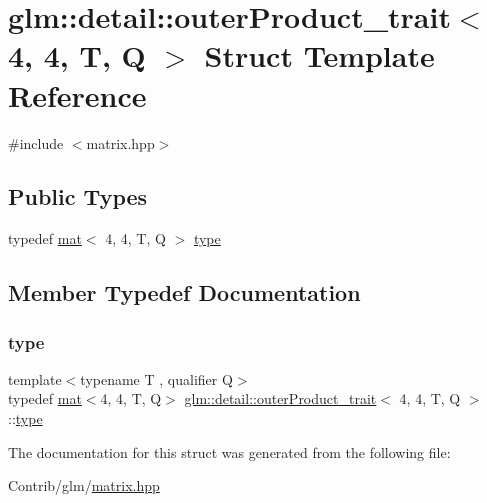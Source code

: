 \hypertarget{structglm_1_1detail_1_1outer_product__trait_3_014_00_014_00_01_t_00_01_q_01_4}{}\section{glm\+:\+:detail\+:\+:outer\+Product\+\_\+trait$<$ 4, 4, T, Q $>$ Struct Template Reference}
\label{structglm_1_1detail_1_1outer_product__trait_3_014_00_014_00_01_t_00_01_q_01_4}


{\ttfamily \#include $<$matrix.\+hpp$>$}

\subsection*{Public Types}
\begin{DoxyCompactItemize}
\item 
typedef \mbox{\hyperlink{structglm_1_1mat}{mat}}$<$ 4, 4, T, Q $>$ \mbox{\hyperlink{structglm_1_1detail_1_1outer_product__trait_3_014_00_014_00_01_t_00_01_q_01_4_a8406d33a053d454b8546830f1d2ad668}{type}}
\end{DoxyCompactItemize}


\subsection{Member Typedef Documentation}
\mbox{\label{structglm_1_1detail_1_1outer_product__trait_3_014_00_014_00_01_t_00_01_q_01_4_a8406d33a053d454b8546830f1d2ad668}} 
\subsubsection{\texorpdfstring{type}{type}}
{\footnotesize\ttfamily template$<$typename T , qualifier Q$>$ \\
typedef \mbox{\hyperlink{structglm_1_1mat}{mat}}$<$4, 4, T, Q$>$ \mbox{\hyperlink{structglm_1_1detail_1_1outer_product__trait}{glm\+::detail\+::outer\+Product\+\_\+trait}}$<$ 4, 4, T, Q $>$\+::\mbox{\hyperlink{structglm_1_1detail_1_1outer_product__trait_3_014_00_014_00_01_t_00_01_q_01_4_a8406d33a053d454b8546830f1d2ad668}{type}}}



The documentation for this struct was generated from the following file\+:\begin{DoxyCompactItemize}
\item 
Contrib/glm/\mbox{\hyperlink{matrix_8hpp}{matrix.\+hpp}}\end{DoxyCompactItemize}
